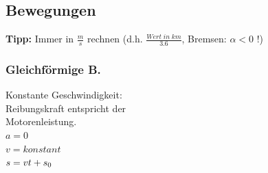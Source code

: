 \subsection{Bewegungen}
\textbf{Tipp:} Immer in $\frac{m}{s}$ rechnen (d.h. $\frac{Wert \; in \; km}{3.6}$, 	Bremsen: $\alpha < 0$ !)
\begin{multicols}{3}
	\subsubsection{Gleichförmige B.}
	Konstante Geschwindigkeit: \\
	Reibungskraft entspricht der \\
	Motorenleistung. \\
	$a = 0$ \\
	$v = konstant$\\
	$s = vt + s\textsubscript{0}$ \\
	\\
	\\
\columnbreak

\end{multicols}
